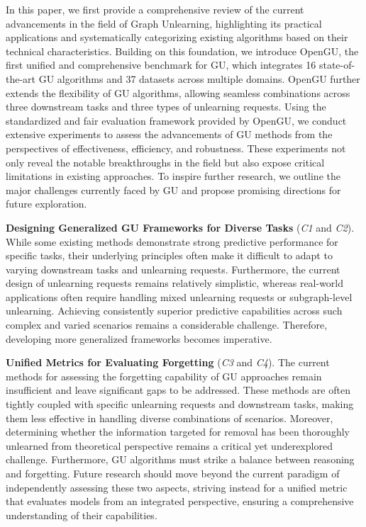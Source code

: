 In this paper, we first provide a comprehensive review of the current advancements in the field of Graph Unlearning, highlighting its practical applications and systematically categorizing existing algorithms based on their technical characteristics. Building on this foundation, we introduce OpenGU, the first unified and comprehensive benchmark for GU, which integrates 16 state-of-the-art GU algorithms and 37 datasets across multiple domains. OpenGU further extends the flexibility of GU algorithms, allowing seamless combinations across three downstream tasks and three types of unlearning requests. Using the standardized and fair evaluation framework provided by OpenGU, we conduct extensive experiments to assess the advancements of GU methods from the perspectives of effectiveness, efficiency, and robustness. These experiments not only reveal the notable breakthroughs in the field but also expose critical limitations in existing approaches. To inspire further research, we outline the major challenges currently faced by GU and propose promising directions for future exploration.

\textbf{Designing Generalized GU Frameworks for Diverse Tasks} (\textit{C1} and \textit{C2}). While some existing methods demonstrate strong predictive performance for specific tasks, their underlying principles often make it difficult to adapt to varying downstream tasks and unlearning requests. Furthermore, the current design of unlearning requests remains relatively simplistic, whereas real-world applications often require handling mixed unlearning requests or subgraph-level unlearning. Achieving consistently superior predictive capabilities across such complex and varied scenarios remains a considerable challenge. Therefore, developing more generalized frameworks becomes imperative.

\textbf{Unified Metrics for Evaluating Forgetting} (\textit{C3} and \textit{C4}). The current methods for assessing the forgetting capability of GU approaches remain insufficient and leave significant gaps to be addressed. These methods are often tightly coupled with specific unlearning requests and downstream tasks, making them less effective in handling diverse combinations of scenarios. Moreover, determining whether the information targeted for removal has been thoroughly unlearned from theoretical perspective remains a critical yet underexplored challenge. Furthermore, GU algorithms must strike a balance between reasoning and forgetting. Future research should move beyond the current paradigm of independently assessing these two aspects, striving instead for a unified metric that evaluates models from an integrated perspective, ensuring a comprehensive understanding of their capabilities.

